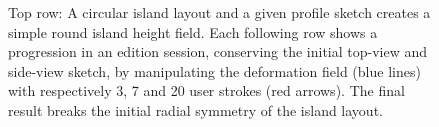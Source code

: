 \begin{figure} 
    \caption{Top row: A circular island layout and a given profile sketch creates a simple round island height field. Each following row shows a progression in an edition session, conserving the initial top-view and side-view sketch, by manipulating the deformation field (blue lines) with respectively 3, 7 and 20 user strokes (red arrows). The final result breaks the initial radial symmetry of the island layout. }
    \label{fig:coral-island-wind-stroke-edition}
\end{figure}






